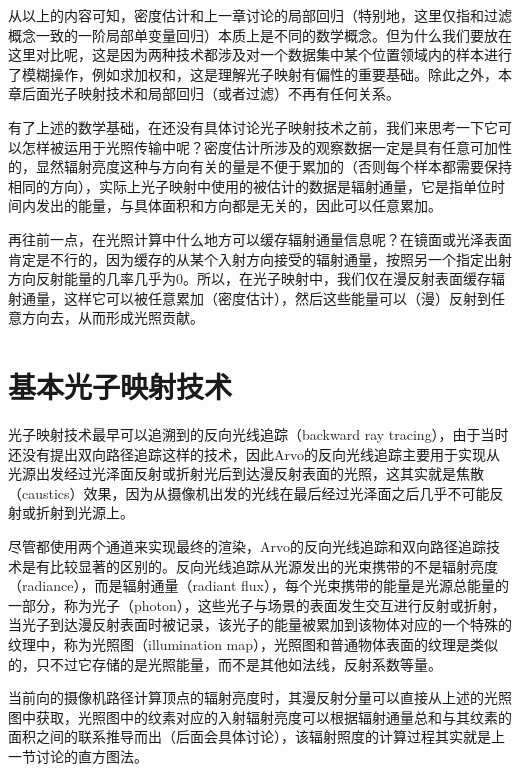 从以上的内容可知，密度估计和上一章讨论的局部回归（特别地，这里仅指和过滤概念一致的一阶局部单变量回归）本质上是不同的数学概念。但为什么我们要放在这里对比呢，这是因为两种技术都涉及对一个数据集中某个位置领域内的样本进行了模糊操作，例如求加权和，这是理解光子映射有偏性的重要基础。除此之外，本章后面光子映射技术和局部回归（或者过滤）不再有任何关系。

有了上述的数学基础，在还没有具体讨论光子映射技术之前，我们来思考一下它可以怎样被运用于光照传输中呢？密度估计所涉及的观察数据一定是具有任意可加性的，显然辐射亮度这种与方向有关的量是不便于累加的（否则每个样本都需要保持相同的方向），实际上光子映射中使用的被估计的数据是辐射通量，它是指单位时间内发出的能量，与具体面积和方向都是无关的，因此可以任意累加。

再往前一点，在光照计算中什么地方可以缓存辐射通量信息呢？在镜面或光泽表面肯定是不行的，因为缓存的从某个入射方向接受的辐射通量，按照另一个指定出射方向反射能量的几率几乎为0。所以，在光子映射中，我们仅在漫反射表面缓存辐射通量，这样它可以被任意累加（密度估计），然后这些能量可以（漫）反射到任意方向去，从而形成光照贡献。





\section{基本光子映射技术}\label{sec:pm-regular-pm}
光子映射技术最早可以追溯到\cite{a:Backwardraytracing}的反向光线追踪（backward ray tracing），由于当时还没有提出双向路径追踪这样的技术，因此Arvo的反向光线追踪主要用于实现从光源出发经过光泽面反射或折射光后到达漫反射表面的光照，这其实就是焦散（caustics）效果，因为从摄像机出发的光线在最后经过光泽面之后几乎不可能反射或折射到光源上。

尽管都使用两个通道来实现最终的渲染，Arvo的反向光线追踪和双向路径追踪技术是有比较显著的区别的。反向光线追踪从光源发出的光束携带的不是辐射亮度（radiance），而是辐射通量（radiant flux），每个光束携带的能量是光源总能量的一部分，称为光子（photon），这些光子与场景的表面发生交互进行反射或折射，当光子到达漫反射表面时被记录，该光子的能量被累加到该物体对应的一个特殊的纹理中，称为光照图（illumination map），光照图和普通物体表面的纹理是类似的，只不过它存储的是光照能量，而不是其他如法线，反射系数等量。

当前向的摄像机路径计算顶点的辐射亮度时，其漫反射分量可以直接从上述的光照图中获取，光照图中的纹素对应的入射辐射亮度可以根据辐射通量总和与其纹素的面积之间的联系推导而出（后面会具体讨论），该辐射照度的计算过程其实就是上一节讨论的直方图法。

